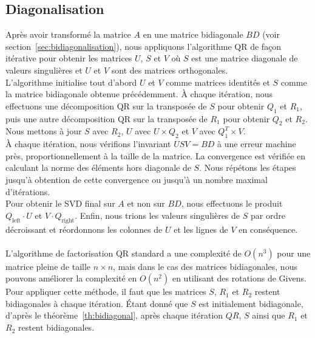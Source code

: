 \documentclass{article}
\begin{document}
\subsection{Diagonalisation}
Après avoir transformé la matrice $A$ en une matrice bidiagonale $BD$ (voir section~\ref{sec:bidiagonalisation}), nous appliquons l'algorithme QR de façon itérative pour obtenir les matrices $U$, $S$ et $V$ où $S$ est une matrice diagonale de valeurs singulières et $U$ et $V$ sont des matrices orthogonales.\\
L'algorithme initialise tout d'abord $U$ et $V$ comme matrices identités et $S$ comme la matrice bidiagonale obtenue précédemment. À chaque itération, nous effectuons une décomposition QR sur la transposée de $S$ pour obtenir $Q_1$ et $R_1$, puis une autre décomposition QR sur la transposée de $R_1$ pour obtenir $Q_2$ et $R_2$. Nous mettons à jour $S$ avec $R_2$, $U$ avec $U \times Q_2$ et $V$ avec $Q_1^T \times V$. \\
À chaque itération, nous vérifions l'invariant $USV = BD$ à une erreur machine près, proportionnellement à la taille de la matrice. La convergence est vérifiée en calculant la norme des éléments hors diagonale de $S$. Nous répétons les étapes jusqu'à obtention de cette convergence ou jusqu'à un nombre maximal d'itérations.\\
Pour obtenir le SVD final sur $A$ et non sur $BD$, nous effectuons le produit $Q_{\text{left}} \cdot U$ et $V \cdot Q_{\text{right}}$. Enfin, nous trions les valeurs singulières de $S$ par ordre décroissant et réordonnons les colonnes de $U$ et les lignes de $V$ en conséquence.
\\ \\
L'algorithme de factorisation QR standard a une complexité de $O(n^3)$ pour une matrice pleine de taille $n \times n$, mais dans le cas des matrices bidiagonales, nous pouvons améliorer la complexité en $O(n^2)$ en utilisant des rotations de Givens.\\
Pour appliquer cette méthode, il faut que les matrices $S$, $R_1$ et $R_2$ restent bidiagonales à chaque itération. Étant donné que $S$ est initialement bidiagonale, d'après le théorème~\ref{th:bidiagonal}, après chaque itération $QR$, $S$ ainsi que $R_1$ et $R_2$ restent bidiagonales.
\end{document}
